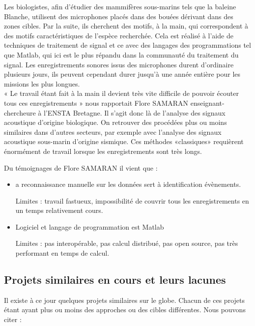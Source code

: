 \documentclass[a4paper]{article}
\begin{document}
Les biologistes, afin d’étudier des mammifères sous-marins tels que la baleine Blanche, utilisent
des microphones placés dans des bouées dérivant dans des zones cibles. Par la suite, ils
cherchent des motifs, à la main, qui correspondent à des motifs caractéristiques de l’espèce
recherchée. Cela est réalisé à l’aide de techniques de traitement de signal et ce avec des langages
des programmations tel que Matlab, qui ici est le plus répandu dans la communauté du
traitement du signal. Les enregistrements sonores issus des microphones durent d’ordinaire
plusieurs jours, ils peuvent cependant durer jusqu’à une année entière pour les missions les
plus longues.
\\

« Le travail étant fait à la main il devient très vite difficile de pouvoir écouter tous
ces enregistrements » nous rapportait Flore SAMARAN enseignant-chercheure à l’ENSTA
Bretagne. Il s’agit donc là de l’analyse des signaux acoustique d’origine biologique. On retrouver
des procédées plus ou moins similaires dans d’autres secteurs, par exemple avec l’analyse des
signaux acoustique sous-marin d’origine sismique. Ces méthodes «classiques» requièrent
énormément de travail lorsque les enregistrements sont très longs.

Du témoignages de Flore SAMARAN il vient que :

\begin{itemize}
\item a reconnaissance manuelle sur les données sert à identification évènements.

Limites : travail fastueux, impossibilité de couvrir tous les enregistrements en un temps
relativement cours.

\item Logiciel et langage de programmation est Matlab

Limites : pas interopérable, pas calcul distribué, pas open source, pas très performant en
temps de calcul.

\end{itemize}

\subsection{Projets similaires en cours et leurs lacunes}

Il existe à ce jour quelques projets similaires sur le globe. Chacun de ces projets étant ayant plus
ou moins des approches ou des cibles différentes. Nous pouvons citer :
\end{document}
